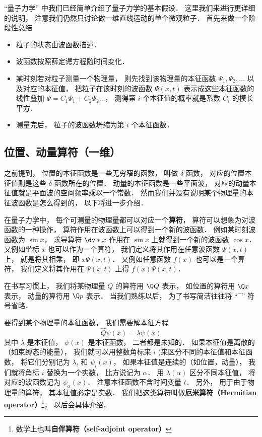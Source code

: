 


“量子力学” 中我们已经简单介绍了量子力学的基本假设． 这里我们来进行更详细的说明， 注意我们仍然只讨论做一维直线运动的单个微观粒子． 首先来做一个阶段性总结
\begin{itemize}
\item 粒子的状态由波函数描述．
\item 波函数按照薛定谔方程随时间变化．
\item 某时刻若对粒子测量一个物理量， 则先找到该物理量的本征函数 $\Psi_1, \Psi_2, \dots$ 以及对应的本征值， 把粒子在该时刻的波函数 $\Psi(x, t)$ 表示成这些本征函数的线性叠加 $\Psi = C_1 \Psi_1 + C_2 \Psi_2\dots$， 测得第 $i$ 个本征值的概率就是系数 $C_i$ 的模长平方．
\item 测量完后， 粒子的波函数坍缩为第 $i$ 个本征函数．
\end{itemize}

\subsection{位置、动量算符（一维）}
之前提到， 位置的本征函数是一些无穷窄的函数， 叫做 $\delta$ 函数， 对应的位置本征值则是这些 $\delta$ 函数所在的位置． 动量的本征函数是一些平面波， 对应的动量本征值就是平面波的空间频率乘以一个常数． 然而我们并没有说明某个物理量的本征波函数是怎么得到的， 以下将进一步介绍．

在量子力学中， 每个可测量的物理量都可以对应一个\textbf{算符}， 算符可以想象为对波函数的一种操作， 算符作用在波函数上可以得到一个新的波函数． 例如某时刻波函数为 $\sin x$， 求导算符 $\dv*{x}$ 作用在 $\sin x$ 上就得到一个新的波函数 $\cos x$． 又例如坐标 $x$ 也可以作为一个算符， 我们定义将其作用在任意波函数 $\Psi(x, t)$ 上， 就是将其相乘， 即 $x\Psi(x, t)$． 又例如任意函数 $f(x)$ 也可以是一个算符， 我们定义将其作用在 $\Psi(x, t)$ 上得 $f(x)\Psi(x, t)$．

在书写习惯上， 我们将某物理量 $Q$ 的算符用 $\Q Q$ 表示， 如位置的算符用 $\Q x$ 表示， 动量的算符用 $\Q p$ 表示． 当我们熟练以后， 为了书写简洁往往将 “$\hat{\phantom{x}}$” 符号省略．

要得到某个物理量的本征函数， 我们需要解本征方程
\begin{equation}
\hat Q \psi(x) = \lambda \psi(x)
\end{equation}
其中 $\lambda$ 是本征值， $\psi(x)$ 是本征函数， 二者都是未知的． 如果本征值是离散的（如束缚态的能量）， 我们就可以用整数角标来 $i$ (来区分不同的本征值和本征函数， 将它们分别记为 $\lambda_i$ 和 $\psi_i(x)$， 如果本征值是连续的（如位置，动量）， 我们就将角标 $i$ 替换为一个实数， 比方说记为 $\alpha$． 用 $\lambda(\alpha)$ 区分不同本征值， 将对应的波函数记为 $\psi_\alpha(x)$． 注意本征函数不含时间变量 $t$． 另外， 用于由于物理量的算符， 其本征值必定是实数． 我们把这类算符叫做\textbf{厄米算符（Hermitian operator）}\footnote{数学上也叫\textbf{自伴算符（self-adjoint operator）}}， 以后会具体介绍．

